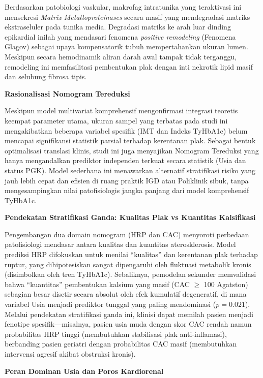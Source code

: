 \documentclass[
  indonesian,
]{agujournal2019}
\begin{document}
Berdasarkan patobiologi vaskular, makrofag intratunika yang teraktivasi
ini mensekresi \emph{Matrix Metalloproteinases} secara masif yang
mendegradasi matriks ekstraseluler pada tunika media. Degradasi matriks
ke arah luar dinding epikardial inilah yang mendasari fenomena
\emph{positive remodeling} (Fenomena Glagov) sebagai upaya kompensatorik
tubuh mempertahankan ukuran lumen. Meskipun secara hemodinamik aliran
darah awal tampak tidak terganggu, remodeling ini memfasilitasi
pembentukan plak dengan inti nekrotik lipid masif dan selubung fibrosa
tipis.

\textbf{Rasionalisasi Nomogram Tereduksi}

Meskipun model multivariat komprehensif mengonfirmasi integrasi teoretis
keempat parameter utama, ukuran sampel yang terbatas pada studi ini
mengakibatkan beberapa variabel spesifik (IMT dan Indeks TyHbA1c) belum
mencapai signifikansi statistik parsial terhadap kerentanan plak.
Sebagai bentuk optimalisasi translasi klinis, studi ini juga menyajikan
Nomogram Tereduksi yang hanya mengandalkan prediktor independen terkuat
secara statistik (Usia dan status PGK). Model sederhana ini menawarkan
alternatif stratifikasi risiko yang jauh lebih cepat dan efisien di
ruang praktik IGD atau Poliklinik sibuk, tanpa mengesampingkan nilai
patofisiologis jangka panjang dari model komprehensif TyHbA1c.

\textbf{Pendekatan Stratifikasi Ganda: Kualitas Plak vs Kuantitas
Kalsifikasi}

Pengembangan dua domain nomogram (HRP dan CAC) menyoroti perbedaan
patofisiologi mendasar antara kualitas dan kuantitas aterosklerosis.
Model prediksi HRP difokuskan untuk menilai ``kualitas'' dan kerentanan
plak terhadap ruptur, yang dihipotesiskan sangat dipengaruhi oleh
fluktuasi metabolik kronis (disimbolkan oleh tren TyHbA1c). Sebaliknya,
pemodelan sekunder memvalidasi bahwa ``kuantitas'' pembentukan kalsium
yang masif (CAC \(\ge\) 100 Agatston) sebagian besar disetir secara
absolut oleh efek kumulatif degeneratif, di mana variabel Usia menjadi
prediktor tunggal yang paling mendominasi (\(p=0.021\)). Melalui
pendekatan stratifikasi ganda ini, klinisi dapat memilah pasien menjadi
fenotipe spesifik---misalnya, pasien usia muda dengan skor CAC rendah
namun probabilitas HRP tinggi (membutuhkan stabilisasi plak
anti-inflamasi), berbanding pasien geriatri dengan probabilitas CAC
masif (membutuhkan intervensi agresif akibat obstruksi kronis).

\textbf{Peran Dominan Usia dan Poros Kardiorenal}
\end{document}
